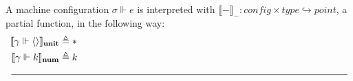 \begin{definition}
  A machine configuration $\sigma \Vdash e$ is interpreted with $\llbracket -
  \rrbracket_{ - } : \textit{config} \times \textit{type} \hookrightarrow
  \textit{point}$, a partial function, in the following way:
  \begin{equation}
  \begin{aligned}[c]
  \llbracket \gamma \Vdash \langle \rangle \rrbracket_{\textbf{unit}}
    &\triangleq * \\
  \llbracket \gamma \Vdash k \rrbracket_{\textbf{num}} &\triangleq k \\
  \rule{5em}{0.4pt}&\rule{30em}{0.4pt}\\

\end{aligned}
\end{equation}
\end{definition}
